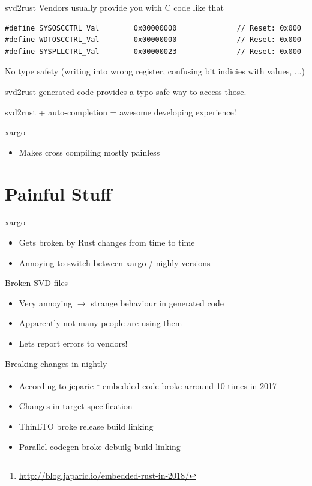 \documentclass[aspectratio=1610,14pt,t]{beamer}
\begin{document}
\begin{frame}[c,fragile]{svd2rust}
  Vendors usually provide you with C code like that
  \begin{verbatim}
#define SYSOSCCTRL_Val        0x00000000              // Reset: 0x000
#define WDTOSCCTRL_Val        0x00000000              // Reset: 0x000
#define SYSPLLCTRL_Val        0x00000023              // Reset: 0x000
  \end{verbatim}
  No type safety (writing into wrong register, confusing bit indicies with values, ...)

  svd2rust generated code provides a typo-safe way to access those.

  svd2rust + auto-completion = awesome developing experience!
\end{frame}

\begin{frame}[c]{xargo}
  \begin{itemize}
    \item Makes cross compiling mostly painless
  \end{itemize}
\end{frame}

\section{Painful Stuff}

\begin{frame}[c]{xargo}
  \begin{itemize}
    \item Gets broken by Rust changes from time to time
    \item Annoying to switch between xargo / nighly versions
  \end{itemize}
\end{frame}

\begin{frame}[c]{Broken SVD files}
  \begin{itemize}
    \item Very annoying $\rightarrow$ strange behaviour in generated code
    \item Apparently not many people are using them
    \item Lets report errors to vendors!
  \end{itemize}
\end{frame}

\begin{frame}[c]{Breaking changes in nightly}
  \begin{itemize}
    \item According to jeparic
      \footnote{\url{http://blog.japaric.io/embedded-rust-in-2018/}} embedded
      code broke arround 10 times in 2017
    \item Changes in target specification
    \item ThinLTO broke release build linking
    \item Parallel codegen broke debuilg build linking
  \end{itemize}
\end{frame}
\end{document}
